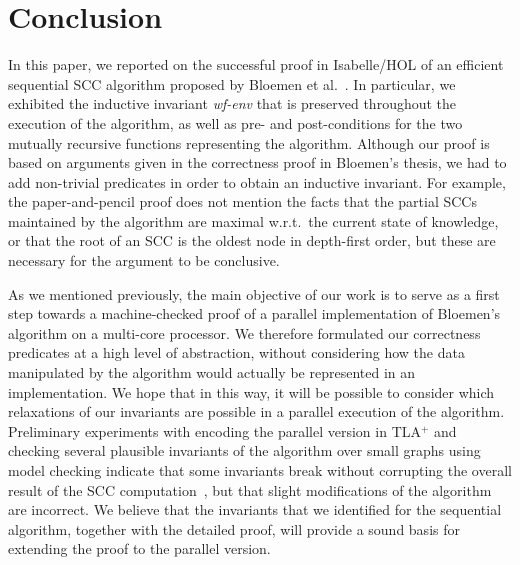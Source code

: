 \documentclass[sigplan,10pt,anonymous,review]{acmart}
\newcommand{\prog}[1]{\textit{#1}}
\begin{document}
\section{Conclusion}
\label{sec:conclusion}

In this paper, we reported on the successful proof in Isabelle/HOL of an efficient sequential SCC algorithm proposed by Bloemen et al.~\cite{bloemen:strong}. In particular, we exhibited the inductive invariant \prog{wf-env} that is preserved throughout the execution of the algorithm, as well as pre- and post-conditions for the two mutually recursive functions representing the algorithm. Although our proof is based on arguments given in the correctness proof in Bloemen's thesis, we had to add non-trivial predicates in order to obtain an inductive invariant. For example, the paper-and-pencil proof does not mention the facts that the partial SCCs maintained by the algorithm are maximal w.r.t.\ the current state of knowledge, or that the root of an SCC is the oldest node in depth-first order, but these are necessary for the argument to be conclusive.

As we mentioned previously, the main objective of our work is to serve as a first step towards a machine-checked proof of a parallel implementation of Bloemen's algorithm on a multi-core processor. We therefore formulated our correctness predicates at a high level of abstraction, without considering how the data manipulated by the algorithm would actually be represented in an implementation. We hope that in this way, it will be possible to consider which relaxations of our invariants are possible in a parallel execution of the algorithm. Preliminary experiments with encoding the parallel version in TLA$^+$ and checking several plausible invariants of the algorithm over small graphs using model checking indicate that some invariants break without corrupting the overall result of the SCC computation~\cite{vandepol:exploring}, but that slight modifications of the algorithm are incorrect. We believe that the invariants that we identified for the sequential algorithm, together with the detailed proof, will provide a sound basis for extending the proof to the parallel version.


\end{document}
